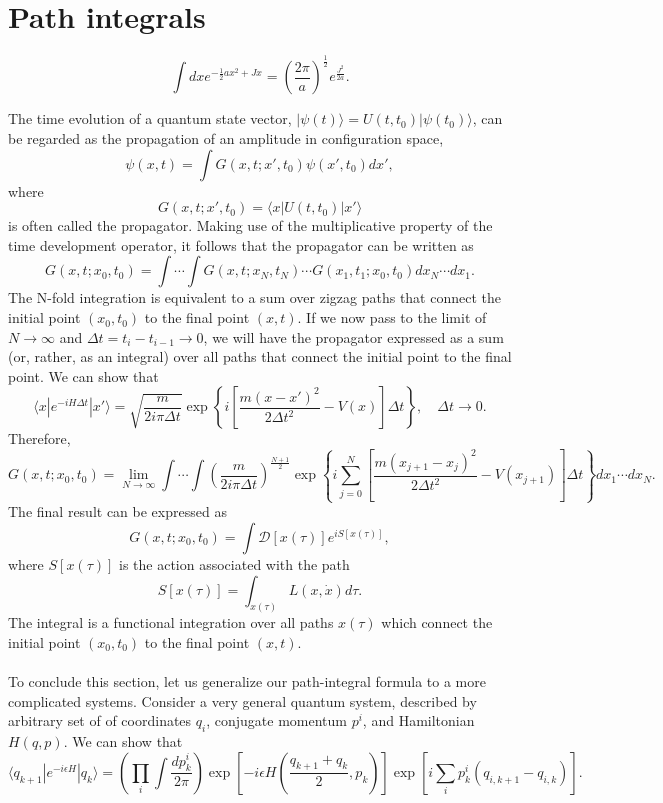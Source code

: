 \section{Path integrals}
\begin{newthem}
\[\int dx e^{-\frac{1}{2} ax^2 + Jx} = \left( \frac{2\pi}{a}\right)^{\frac{1}{2}} e^{\frac{J^2}{2a}}.\]
\end{newthem}
\noindent
The time evolution of a quantum state vector, $|\psi(t)\rangle = U(t,t_0)| \psi(t_0)\rangle$, can be regarded as the propagation of an amplitude in configuration space,
\[\psi(x,t) = \int G(x,t;x',t_0) \psi(x',t_0)dx',\]
where
\[G(x,t;x',t_0) = \langle x | U(t,t_0) | x' \rangle\]
is often called the propagator.
Making use of the multiplicative property of the time development operator, it follows that the propagator can be written as
\[G(x,t;x_0,t_0) = \int \cdots \int G(x,t;x_N,t_N) \cdots G(x_1,t_1;x_0,t_0) dx_N \cdots dx_1.\]
The N-fold integration is equivalent to a sum over zigzag paths that connect the initial point $(x_0,t_0)$ to the final point $(x,t)$. If we now pass to the limit of $N \to \infty$ and $\Delta t = t_i - t_{i-1} \to 0$, we will have the propagator expressed as a sum (or, rather, as an integral) over all paths
that connect the initial point to the final point.
We can show that
\[\langle x | e^{-iH \Delta t} | x' \rangle = \sqrt{\frac{m}{2i\pi\Delta t}} \exp \left\{ i\left[ \frac{m(x-x')^2}{2\Delta t^2}   -V(x) \right] \Delta t \right\} , \quad \Delta t \to 0 .\]
Therefore,
\[G(x,t;x_0,t_0) = \lim_{N \to \infty} \int \cdots \int \left(\frac{m}{2i\pi\Delta t}\right)^{\frac{N+1}{2}} \exp \left\{ i \sum_{j=0}^{N}\left[ \frac{m(x_{j+1}-x_{j})^2}{2\Delta t^2}   -V(x_{j+1}) \right] \Delta t \right\} dx_1 \cdots dx_N.\]
The final result can be expressed as
\[G(x,t;x_0,t_0) = \int \mathcal{D}[x(\tau)] e^{iS[x(\tau)]},\]
where $S[x(\tau)]$ is the action associated with the path
\[S[x(\tau)] = \int_{x(\tau)} L(x,\dot{x}) d\tau.\]
The integral is a functional integration over all paths $x(\tau)$ which connect the initial point $(x_0,t_0)$ to the final point $(x,t)$.
\\ \\
To conclude this section, let us generalize our path-integral formula to a more complicated systems. Consider a very general quantum system, described by arbitrary set of of coordinates $q_i$, conjugate momentum $p^i$, and Hamiltonian $H(q,p)$. 
We can show that
\[\langle q_{k+1} | e^{-i\epsilon H} | q_{k}\rangle = \left( \prod_i \int \frac{dp^i_k}{2\pi}\right) \exp \left[ -i\epsilon H \left( \frac{q_{k+1}+q_{k}}{2},p_k\right) \right] \exp \left[ i \sum_i p_k^i (q_{i,k+1} - q_{i,k})\right] .\] 
